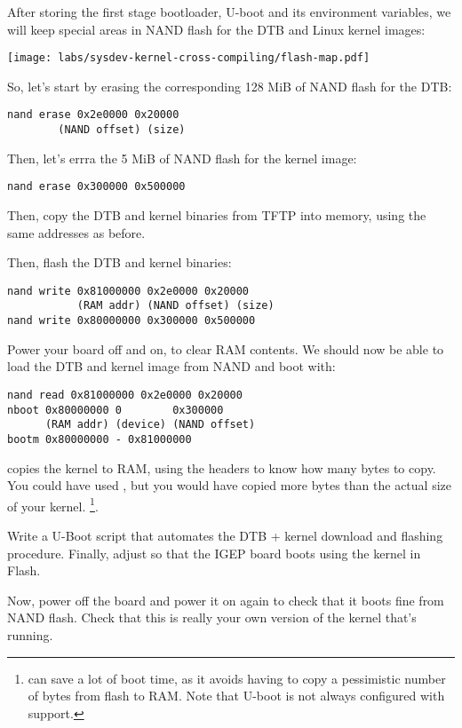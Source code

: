 After storing the first stage bootloader, U-boot and its environment
variables, we will keep special areas in NAND flash for the DTB
and Linux kernel images:

\begin{center}
  \texttt{[image: labs/sysdev-kernel-cross-compiling/flash-map.pdf]}
\end{center}

So, let's start by erasing the corresponding 128 MiB of NAND flash
for the DTB:

\begin{verbatim}
nand erase 0x2e0000 0x20000
        (NAND offset) (size)
\end{verbatim}

Then, let's errra the 5 MiB of NAND flash for the kernel image:

\begin{verbatim}
nand erase 0x300000 0x500000
\end{verbatim}

Then, copy the DTB and kernel binaries from TFTP into memory, using the
same addresses as before.

Then, flash the DTB and kernel binaries:

\begin{verbatim}
nand write 0x81000000 0x2e0000 0x20000
           (RAM addr) (NAND offset) (size)
nand write 0x80000000 0x300000 0x500000
\end{verbatim}

Power your board off and on, to clear RAM contents. We should now be
able to load the DTB and kernel image from NAND and boot with:

\begin{verbatim}
nand read 0x81000000 0x2e0000 0x20000
nboot 0x80000000 0        0x300000
      (RAM addr) (device) (NAND offset)
bootm 0x80000000 - 0x81000000
\end{verbatim}

 copies the kernel to RAM, using the  headers
to know how many bytes to copy. You could have used , but you would have copied more bytes than
the actual size of your kernel. \footnote{ can save a lot 
of boot time, as it avoids having to copy a pessimistic number of
bytes from flash to RAM. Note that U-boot is not always configured
with  support.}.

Write a U-Boot script that automates the DTB + kernel download
and flashing procedure. Finally, adjust  so that
the IGEP board boots using the kernel in Flash.

Now, power off the board and power it on again to check that it boots
fine from NAND flash. Check that this is really your own version of
the kernel that's running.

